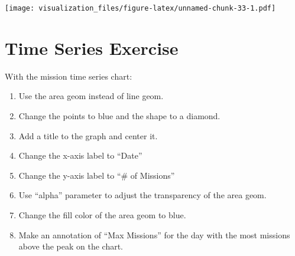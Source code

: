 \documentclass[oneside]{memoir}
\newenvironment{Shaded}{\begin{snugshade}}{\end{snugshade}}
\newcommand{\KeywordTok}[1]{\textcolor[rgb]{0.13,0.29,0.53}{\textbf{#1}}}
\newcommand{\DataTypeTok}[1]{\textcolor[rgb]{0.13,0.29,0.53}{#1}}
\newcommand{\DecValTok}[1]{\textcolor[rgb]{0.00,0.00,0.81}{#1}}
\newcommand{\StringTok}[1]{\textcolor[rgb]{0.31,0.60,0.02}{#1}}
\newcommand{\OperatorTok}[1]{\textcolor[rgb]{0.81,0.36,0.00}{\textbf{#1}}}
\newcommand{\NormalTok}[1]{#1}
\theoremstyle{definition}
\theoremstyle{definition}
\theoremstyle{definition}
\theoremstyle{remark}
\begin{document}
\begin{Shaded}
\end{Shaded}

\texttt{[image: visualization\_files/figure-latex/unnamed-chunk-33-1.pdf]}

\section{Time Series Exercise}\label{time-series-exercise}

With the mission time series chart:

\begin{enumerate}
\def\labelenumi{\arabic{enumi}.}
\item
  Use the area geom instead of line geom.
\item
  Change the points to blue and the shape to a diamond.
\item
  Add a title to the graph and center it.
\item
  Change the x-axis label to ``Date''
\item
  Change the y-axis label to ``\# of Missions''
\item
  Use ``alpha'' parameter to adjust the transparency of the area geom.
\item
  Change the fill color of the area geom to blue.
\item
  Make an annotation of ``Max Missions'' for the day with the most
  missions above the peak on the chart.
\end{enumerate}
\end{document}
